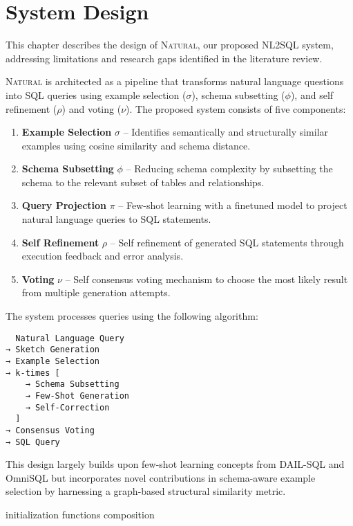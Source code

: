 \section{System Design}

This chapter describes the design of \textsc{Natural}, our proposed NL2SQL system, 
addressing limitations and research gaps identified in the literature review.

\textsc{Natural} is architected as a pipeline that transforms natural
language questions into SQL queries using example selection ($\sigma$),
schema subsetting ($\phi$), and self refinement ($\rho$) and voting ($\nu$).
The proposed system consists of five components:

\begin{enumerate}
    \item \textbf{Example Selection} $\sigma$ – Identifies semantically and structurally similar examples using cosine similarity and schema distance.
    \item \textbf{Schema Subsetting} $\phi$ – Reducing schema complexity by subsetting the schema to the relevant subset of tables and relationships.
    \item \textbf{Query Projection} $\pi$ – Few-shot learning with a finetuned model to project natural language queries to SQL statements.
    \item \textbf{Self Refinement} $\rho$ – Self refinement of generated SQL statements through execution feedback and error analysis.
    \item \textbf{Voting} $\nu$ – Self consensus voting mechanism to choose the most likely result from multiple generation attempts.
\end{enumerate}

The system processes queries using the following algorithm:


\begin{verbatim}
  Natural Language Query 
→ Sketch Generation
→ Example Selection
→ k-times [
    → Schema Subsetting
    → Few-Shot Generation
    → Self-Correction
  ]
→ Consensus Voting
→ SQL Query
\end{verbatim}

This design largely builds upon few-shot learning concepts from DAIL-SQL \citep{DAIL-SQL}
and OmniSQL \citep{OmniSQL} but incorporates novel contributions in schema-aware example
selection by harnessing a graph-based structural similarity metric.

{initialization}
{functions}
{composition}
